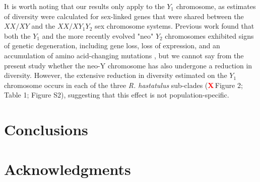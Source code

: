 \documentclass[9pt,twocolumn,twoside]{gsajnl}
\newcommand{\X}{\textcolor{red}{\bf X\,}}
\begin{document}





It is worth noting that our results only apply to the $Y_{1}$ chromosome, as estimates of diversity were calculated for sex-linked genes that were shared between the $XX/XY$ and the $XX/XY_{1}Y_{2}$ sex chromosome systems. Previous work found that both the $Y_{1}$ and the more recently evolved "neo" $Y_{2}$ chromosomes exhibited signs of genetic degeneration, including gene loss, loss of expression, and an accumulation of amino acid-changing mutations \citep{hough2014}, but we cannot say from the present study whether the neo-Y chromosome has also undergone a reduction in diversity. However, the extensive reduction in diversity estimated on the $Y_{1}$ chromosome occurs in each of the three \textit{R. hastatulus} sub-clades (\X Figure 2; Table 1; Figure S2), suggesting that this effect is not population-specific.

\section*{Conclusions}

\section*{Acknowledgments}



\end{document}
